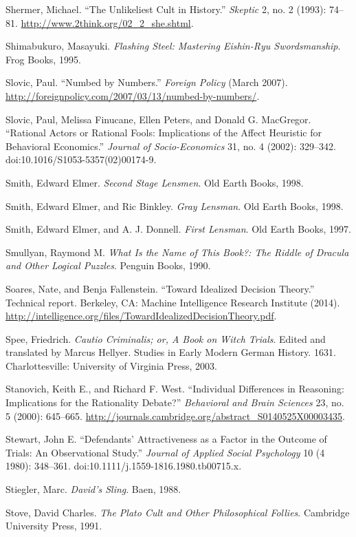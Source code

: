 \documentclass[letterpaper]{book}
\begin{document}
{
 Shermer, Michael. ``The Unlikeliest Cult in
History.'' \textit{Skeptic} 2, no. 2 (1993): 74--81.
\url{http://www.2think.org/02\_2\_she.shtml}.}

{
 Shimabukuro, Masayuki. \textit{Flashing Steel: Mastering
Eishin-Ryu Swordsmanship}. Frog Books, 1995.}

{
 Slovic, Paul. ``Numbed by
Numbers.'' \textit{Foreign Policy} (March 2007).
\url{http://foreignpolicy.com/2007/03/13/numbed-by-numbers/}.}

{
 Slovic, Paul, Melissa Finucane, Ellen Peters, and Donald G.
MacGregor. ``Rational Actors or Rational Fools:
Implications of the Affect Heuristic for Behavioral
Economics.'' \textit{Journal of Socio-Economics} 31,
no. 4 (2002): 329--342. doi:10.1016/S1053-5357(02)00174-9.}

{
 Smith, Edward Elmer. \textit{Second Stage Lensmen}. Old Earth
Books, 1998.}

{
 Smith, Edward Elmer, and Ric Binkley. \textit{Gray Lensman}. Old
Earth Books, 1998.}

{
 Smith, Edward Elmer, and A. J. Donnell. \textit{First Lensman}.
Old Earth Books, 1997.}

{
 Smullyan, Raymond M. \textit{What Is the Name of This Book?: The
Riddle of Dracula and Other Logical Puzzles}. Penguin Books, 1990.}

{
 Soares, Nate, and Benja Fallenstein. ``Toward
Idealized Decision Theory.'' Technical report.
Berkeley, CA: Machine Intelligence Research Institute (2014).
\url{http://intelligence.org/files/TowardIdealizedDecisionTheory.pdf}.}

{
 Spee, Friedrich. \textit{Cautio Criminalis; or, A Book on Witch
Trials}. Edited and translated by Marcus Hellyer. Studies in Early
Modern German History. 1631. Charlottesville: University of Virginia
Press, 2003.}

{
 Stanovich, Keith E., and Richard F. West.
``Individual Differences in Reasoning: Implications
for the Rationality Debate?'' \textit{Behavioral and
Brain Sciences} 23, no. 5 (2000): 645--665.
\url{http://journals.cambridge.org/abstract\_S0140525X00003435}.}

{
 Stewart, John E. ``Defendants'
Attractiveness as a Factor in the Outcome of Trials: An Observational
Study.'' \textit{Journal of Applied Social
Psychology} 10 (4 1980): 348--361.
doi:10.1111/j.1559-1816.1980.tb00715.x.}

{
 Stiegler, Marc. \textit{David's Sling}. Baen,
1988.}

{
 Stove, David Charles. \textit{The Plato Cult and Other
Philosophical Follies}. Cambridge University Press, 1991.}
\end{document}
